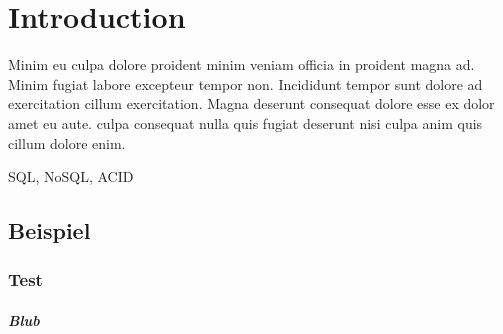 
\chapter{Introduction} \label{ch:introduction}

Minim eu culpa dolore proident minim veniam officia in proident magna ad. Minim fugiat labore excepteur tempor non. Incididunt tempor sunt dolore ad exercitation cillum exercitation. Magna deserunt consequat dolore esse ex dolor amet eu aute. culpa consequat nulla quis fugiat deserunt nisi culpa anim quis cillum dolore enim.

\ac{SQL}, \ac{NoSQL}, \ac{ACID}

\section{Beispiel} \label{sec:beispiel}

\subsection{Test} \label{subsec:test}

\paragraph{Blub} \label{par:blub}